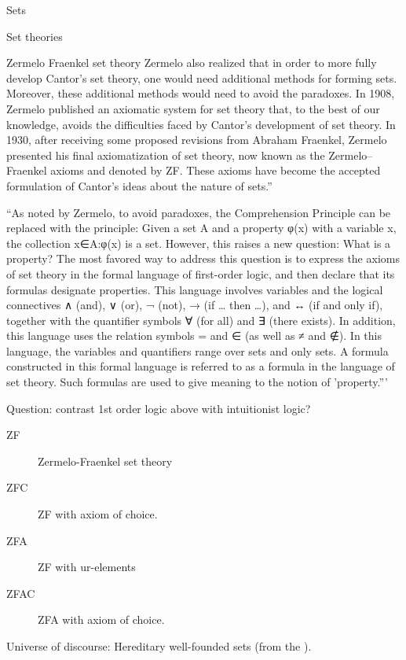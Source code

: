 \begin{plSection}{Sets}
\begin{plSection}{Set theories}
\begin{plSection}{Zermelo Fraenkel set theory}
Zermelo also realized that in order to more fully develop 
Cantor’s set theory, 
one would need additional methods for forming sets. 
Moreover, these additional methods would need 
to avoid the paradoxes. 
In 1908, 
Zermelo published an axiomatic system for set theory that, 
to the best of our knowledge, 
avoids the difficulties faced by 
Cantor’s development of set theory. 
In 1930, 
after receiving some proposed revisions from Abraham Fraenkel,
 Zermelo presented his final axiomatization of set theory, 
 now known as the Zermelo–Fraenkel axioms and denoted by ZF. 
These axioms have become the accepted formulation 
of Cantor’s ideas about the nature of sets.''\cite{iep:SetTheory} 

``As noted by Zermelo, to avoid paradoxes, 
the Comprehension Principle can be replaced with the principle: 
Given a set A and a property φ(x) with a variable x, the 
collection {x∈A:φ(x)} is a set. 
However, this raises a new question: 
What is a property? 
The most favored way to address this question is to express 
the axioms of set theory
in the formal language of first-order logic, 
and then declare that its formulas designate properties. 
This language involves variables and the logical connectives
 ∧ (and), ∨ (or), ¬ (not), → (if … then …), 
 and ↔ (if and only if), 
 together with the quantifier symbols ∀ (for all) 
 and ∃ (there exists). 
 In addition, this language uses the relation symbols
  = and ∈ (as well as ≠ and ∉). 
  In this language, the variables and quantifiers range over sets 
  and only sets. 
  A formula constructed in this formal language is referred to as
   a formula in the language of set theory. Such formulas are used 
   to give meaning to the notion of 
   'property.'''\cite{iep:SetTheory}

Question: 
contrast 1st order logic above 
with intuitionist logic?\cite{wiki:IntuitionisticLogic}

\begin{description}
\item[\textsf{ZF}] Zermelo-Fraenkel set theory\cite{wiki:ZermeloFraenkelSetTheory}
\item[\textsf{ZFC}] \textsf{ZF} with axiom of choice\cite{wiki:AxiomOfChoice}.
\item[\textsf{ZFA}] \textsf{ZF} with ur-elements\cite{wiki:Urelement}
\item[\textsf{ZFAC}] \textsf{ZFA} with axiom of choice\cite{wiki:AxiomOfChoice}.
\end{description}

Universe of discourse: 
Hereditary well-founded sets 
(from the ).


\end{plSection}
\end{plSection}
\end{plSection}

